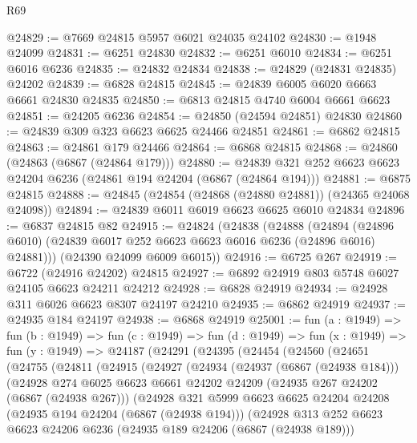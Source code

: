 \begin{lexlean}{R69}
\begin{coremodule}
{@24829 := @7669 @24815 @5957 @6021 @24035 @24102
@24830 := @1948 @24099
@24831 := @6251 @24830
@24832 := @6251 @6010
@24834 := @6251 @6016 @6236
@24835 := @24832 @24834
@24838 := @24829 (@24831 @24835) @24202
@24839 := @6828 @24815
@24845 := @24839 @6005 @6020 @6663 @6661 @24830 @24835
@24850 := @6813 @24815 @4740 @6004 @6661 @6623
@24851 := @24205 @6236
@24854 := @24850 (@24594 @24851) @24830
@24860 := @24839 @309 @323 @6623 @6625 @24466 @24851
@24861 := @6862 @24815
@24863 := @24861 @179 @24466
@24864 := @6868 @24815
@24868 := @24860 (@24863 (@6867 (@24864 @179)))
@24880 := @24839 @321 @252 @6623 @6623 @24204 @6236 (@24861 @194 @24204 (@6867 (@24864 @194)))
@24881 := @6875 @24815
@24888 := @24845 (@24854 (@24868 (@24880 @24881)) (@24365 @24068 @24098))
@24894 := @24839 @6011 @6019 @6623 @6625 @6010 @24834
@24896 := @6837 @24815 @82
@24915 := @24824
    (@24838
      (@24888
        (@24894 (@24896 @6010) (@24839 @6017 @252 @6623 @6623 @6016 @6236 (@24896 @6016) @24881)))
      (@24390 @24099 @6009 @6015))
@24916 := @6725 @267
@24919 := @6722 (@24916 @24202) @24815
@24927 := @6892 @24919 @803 @5748 @6027 @24105 @6623 @24211 @24212
@24928 := @6828 @24919
@24934 := @24928 @311 @6026 @6623 @8307 @24197 @24210
@24935 := @6862 @24919
@24937 := @24935 @184 @24197
@24938 := @6868 @24919
@25001 := fun (a : @1949) =>
  fun (b : @1949) =>
  fun (c : @1949) =>
  fun (d : @1949) =>
  fun (x : @1949) =>
  fun (y : @1949) =>
  @24187
    (@24291
      (@24395
        (@24454
          (@24560
            (@24651
              (@24755
                (@24811
                  (@24915
                    (@24927
                      (@24934
                        (@24937 (@6867 (@24938 @184)))
                        (@24928
                          @274
                          @6025
                          @6623
                          @6661
                          @24202
                          @24209
                          (@24935 @267 @24202 (@6867 (@24938 @267)))
                          (@24928
                            @321
                            @5999
                            @6623
                            @6625
                            @24204
                            @24208
                            (@24935 @194 @24204 (@6867 (@24938 @194)))
                            (@24928
                              @313
                              @252
                              @6623
                              @6623
                              @24206
                              @6236
                              (@24935 @189 @24206 (@6867 (@24938 @189)))
}
\end{coremodule}
\end{lexlean}
